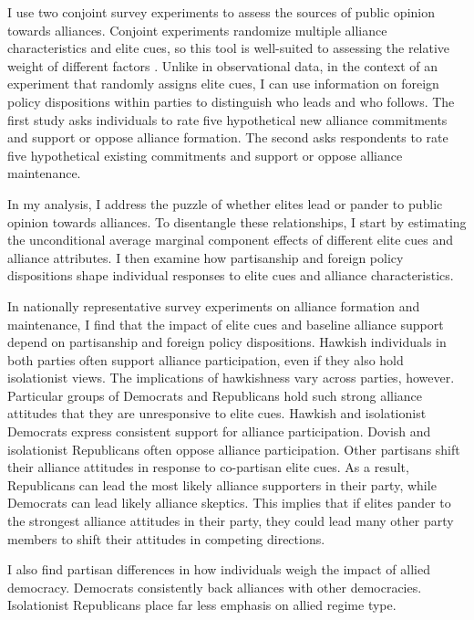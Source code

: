 \documentclass[12pt]{article}
\begin{document}
I use two conjoint survey experiments to assess the sources of public opinion towards alliances. 
Conjoint experiments randomize multiple alliance characteristics and elite cues, so this tool is well-suited to assessing the relative weight of different factors \citep{Hainmuelleretal2014}.
Unlike in observational data, in the context of an experiment that randomly assigns elite cues, I can use information on foreign policy dispositions within parties to distinguish who leads and who follows. 
The first study asks individuals to rate five hypothetical new alliance commitments and support or oppose alliance formation.
The second asks respondents to rate five hypothetical existing commitments and support or oppose alliance maintenance. 


In my analysis, I address the puzzle of whether elites lead or pander to public opinion towards alliances. 
To disentangle these relationships, I start by estimating the unconditional average marginal component effects of different elite cues and alliance attributes.
I then examine how partisanship and foreign policy dispositions shape individual responses to elite cues and alliance characteristics. 


In nationally representative survey experiments on alliance formation and maintenance, I find that the impact of elite cues and baseline alliance support depend on partisanship and foreign policy dispositions. 
Hawkish individuals in both parties often support alliance participation, even if they also hold isolationist views.
The implications of hawkishness vary across parties, however. 
Particular groups of Democrats and Republicans hold such strong alliance attitudes that they are unresponsive to elite cues.
Hawkish and isolationist Democrats express consistent support for alliance participation.
Dovish and isolationist Republicans often oppose alliance participation. 
Other partisans shift their alliance attitudes in response to co-partisan elite cues. 
As a result, Republicans can lead the most likely alliance supporters in their party, while Democrats can lead likely alliance skeptics. 
This implies that if elites pander to the strongest alliance attitudes in their party, they could lead many other party members to shift their attitudes in competing directions. 


I also find partisan differences in how individuals weigh the impact of allied democracy. 
Democrats consistently back alliances with other democracies. 
Isolationist Republicans place far less emphasis on allied regime type. 
\end{document}
